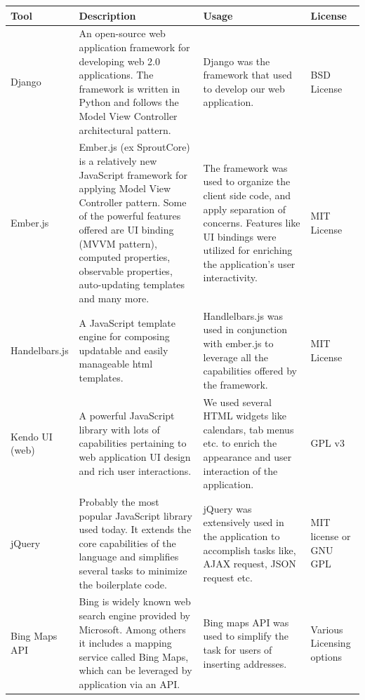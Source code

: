 \begin{longtable}{|p{100px}|p{100px}|p{100px}|p{100px}|}
    \hline
    Tool  & Description & Usage & License \\
    \hline
    Django & An open-source web application framework for developing web 2.0 applications. The framework is written in Python and follows the Model View Controller architectural pattern. & Django was the framework that used to develop our web application. & BSD License \\ \hline

    Ember.js & Ember.js (ex SproutCore) is a relatively new JavaScript framework for applying Model View Controller pattern. Some of the powerful features offered are UI binding (MVVM pattern), computed properties, observable properties, auto-updating templates and many more. & The framework was used to organize the client side code, and apply separation of concerns. Features like UI bindings were utilized for enriching the application's user interactivity. & MIT License \\ \hline

    Handelbars.js & A JavaScript template engine for composing updatable and easily manageable html templates.  & Handlelbars.js was used in conjunction with ember.js to leverage all the capabilities offered by the framework.  & MIT License \\ \hline

    Kendo UI (web) & A powerful JavaScript library with lots of capabilities pertaining to web application UI design and rich user interactions.  & We used several HTML widgets like calendars, tab menus etc. to enrich the appearance and user interaction of the application. & GPL v3 \\
    \hline

    jQuery & Probably the most popular JavaScript library used today. It extends the core capabilities of the language and simplifies several tasks to minimize the boilerplate code. & jQuery was extensively used in the application to accomplish tasks like, AJAX request, JSON request etc. & MIT license or GNU GPL \\
    \hline

    Bing Maps API & Bing is widely known web search engine provided by Microsoft. Among others it includes a mapping service called Bing Maps, which can be leveraged by application via an API. & Bing maps API was used to simplify the task for users of inserting addresses. & Various Licensing options \\
    \hline


\end{longtable}
